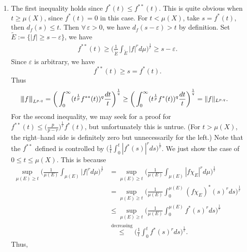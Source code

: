 \begin{enumerate}
\begin{enumerate}
   \item[(b)] The first inequality holds since $f^{*}(t) \leq f^{**}(t)$. 
   This is quite obvious when $t \geq \mu(X)$, since $f^{*}(t)=0$ in this case. 
   For $t < \mu(X)$, take $s=f^{*}(t)$, then $d_{f}(s) \leq t$. 
   Then $\forall\, \varepsilon>0$, we have $d_{f}(s-\varepsilon)>t$ by definition. 
   Set $\tilde{E}:=\{|f| \geq s-\varepsilon\}$, we have
   \begin{equation*}\begin{aligned}
   f^{**}(t) \geq \bigg(\frac{1}{\tilde{E}}\int_{\tilde{E}}|f|^{r}d\mu\bigg)^{\frac{1}{r}} \geq s-\varepsilon.
   \end{aligned}\end{equation*}
   Since $\varepsilon$ is arbitrary, we have
   \[f^{**}(t) \geq s = f^{*}(t).\]
   Thus
   \begin{equation*}\begin{aligned}
   {\left\vert\kern-0.25ex\left\vert\kern-0.25ex\left\vert f \right\vert\kern-0.25ex\right\vert\kern-0.25ex\right\vert}_{L^{p,q}} &= \bigg(\int_{0}^{\infty}(t^{\frac{1}{p}}f^{**}(t))^{q}\frac{dt}{t}\bigg)^{\frac{1}{q}} 
   \geq \bigg(\int_{0}^{\infty}(t^{\frac{1}{p}}f^{*}(t))^{q}\frac{dt}{t}\bigg)^{\frac{1}{q}} = \Vert f \Vert_{L^{p,q}}.
   \end{aligned}\end{equation*}
   For the second inequality, we may seek for a proof for 
   $f^{**}(t) \leq \big(\frac{p}{p-r}\big)^{\frac{1}{r}}f^{*}(t)$, 
   but unfortunately this is untrue. (For $t> \mu(X)$, 
   the right--hand side is definitely zero but unnecessarily for the left.) 
   Note that the $f^{**}$ defined is controlled by 
   $\big(\frac{1}{t}\int_{0}^{t}|f^{*}(s)|^{r}ds\big)^{\frac{1}{r}}$. 
   We just show the case of $0 \leq t \leq \mu(X)$. This is because
   \begin{equation*}\begin{aligned}
   \sup_{\mu(E) \geq t}\bigg(\frac{1}{\mu(E)}\int_{\mu(E)}|f|^{r}d\mu\bigg)^{\frac{1}{r}} 
   &= \sup_{\mu(E) \geq t}\bigg(\frac{1}{\mu(E)}\int_{\mu(E)}|f\chi_{E}|^{r}d\mu\bigg)^{\frac{1}{r}}\\ 
   &= \sup_{\mu(E) \geq t}\bigg(\frac{1}{\mu(E)}\int_{0}^{\mu(E)}(f\chi_{E})^{*}(s)^{r}ds\bigg)^{\frac{1}{r}}\\
   &\leq \sup_{\mu(E) \geq t}\bigg(\frac{1}{\mu(E)}\int_{0}^{\mu(E)}f^{*}(s)^{r}ds\bigg)^{\frac{1}{r}}\\
   &\overset{\text{decreasing}}{\leq} \bigg(\frac{1}{t}\int_{0}^{t}f^{*}(s)^{r}ds\bigg)^{\frac{1}{r}}.
   \end{aligned}\end{equation*}
   Thus,

\end{enumerate}
\end{enumerate}
